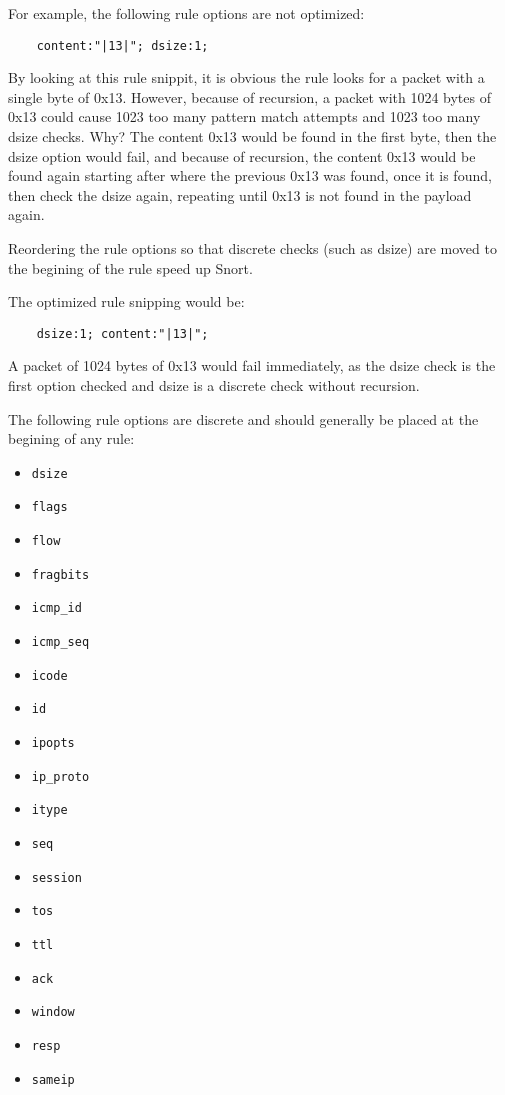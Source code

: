 \documentclass[english]{report}
\begin{document}
For example, the following rule options are not optimized:

\begin{verbatim}
    content:"|13|"; dsize:1;
\end{verbatim}

By looking at this rule snippit, it is obvious the rule looks for a packet with
a single byte of 0x13.  However, because of recursion, a packet with 1024 bytes
of 0x13 could cause 1023 too many pattern match attempts and 1023 too many
dsize checks.  Why?  The content 0x13 would be found in the first byte, then
the dsize option would fail, and because of recursion, the content 0x13 would
be found again starting after where the previous 0x13 was found, once it is
found, then check the dsize again, repeating until 0x13 is not found in the
payload again.

Reordering the rule options so that discrete checks (such as dsize) are moved to the begining of the rule speed up Snort.  

The optimized rule snipping would be:
\begin{verbatim}
    dsize:1; content:"|13|";
\end{verbatim}

A packet of 1024 bytes of 0x13 would fail immediately, as the dsize check is
the first option checked and dsize is a discrete check without recursion.

The following rule options are discrete and should generally be placed at the
begining of any rule:

\begin{itemize}
\item \texttt{dsize}
\item \texttt{flags}
\item \texttt{flow}
\item \texttt{fragbits}
\item \texttt{icmp\_id}
\item \texttt{icmp\_seq} 
\item \texttt{icode} 
\item \texttt{id}
\item \texttt{ipopts}
\item \texttt{ip\_proto} 
\item \texttt{itype} 
\item \texttt{seq}
\item \texttt{session} 
\item \texttt{tos}
\item \texttt{ttl}
\item \texttt{ack}
\item \texttt{window}
\item \texttt{resp} 
\item \texttt{sameip}
\end{itemize}
\end{document}
